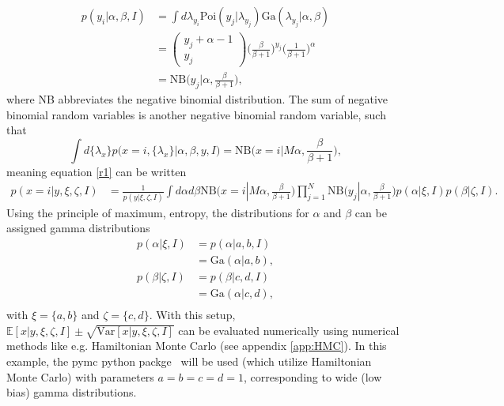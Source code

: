 \begin{example}
\begin{equation}
		\begin{split}
			p(y_i|\alpha,\beta,I) &= \int d \lambda_{y_i} \text{Poi}(y_j|\lambda_{y_j})\text{Ga}(\lambda_{y_j}|\alpha,\beta)\\
			& = \begin{pmatrix}
				y_j+\alpha-1\\
				y_j
			\end{pmatrix}
			\bigg(\frac{\beta}{\beta+1}\bigg)^{y_j}\bigg(\frac{1}{\beta +1}\bigg)^\alpha\\
			&= \text{NB}\bigg(y_j|\alpha,\frac{\beta}{\beta +1}\bigg),
		\end{split}
	\end{equation}
	where NB abbreviates the negative binomial distribution. The sum of negative binomial random variables is another negative binomial random variable, such that
	\begin{equation}
		\int d\{\lambda_x\} p(x=i,\{\lambda_x\}|\alpha, \beta,y,I) = \text{NB}\bigg(x=i|M\alpha,\frac{\beta}{\beta +1}\bigg),
	\end{equation}
	meaning equation \eqref{r1} can be written
	\begin{equation}
		\begin{split}
			p(x = i|y,\xi,\zeta,I) &= \frac{1}{p(y|\xi,\zeta,I)}\int d\alpha d\beta \text{NB}\bigg(x=i|M\alpha,\frac{\beta}{\beta +1}\bigg)\prod_{j=1}^N\text{NB}\bigg(y_j|\alpha,\frac{\beta}{\beta +1}\bigg)p(\alpha|\xi,I)p(\beta|\zeta,I).
		\end{split}
		\label{r2}
	\end{equation}
	Using the principle of maximum, entropy, the distributions for $\alpha$ and $\beta$ can be assigned gamma distributions
	\begin{equation}
		\begin{split}
			p(\alpha|\xi,I) & = p(\alpha|a,b,I)\\
			&= \text{Ga}(\alpha| a, b),\\
			p(\beta|\zeta,I) & = p(\beta|c,d,I)\\
			&= \text{Ga}(\alpha| c, d),\\
		\end{split}
	\end{equation}
	with $\xi = \{a,b\}$ and $\zeta = \{c,d\}$. With this setup, $\mathbb{E}[x|y,\xi,\zeta,I]\pm \sqrt{\text{Var}[x|y,\xi,\zeta,I]}$ can be evaluated numerically using numerical methods like e.g. Hamiltonian Monte Carlo (see appendix \ref{app:HMC}). In this example, the pymc python packge~\citep{pymc} will be used (which utilize Hamiltonian Monte Carlo) with parameters $a=b=c=d =1$, corresponding to wide (low bias) gamma distributions. 
	

\end{example}
